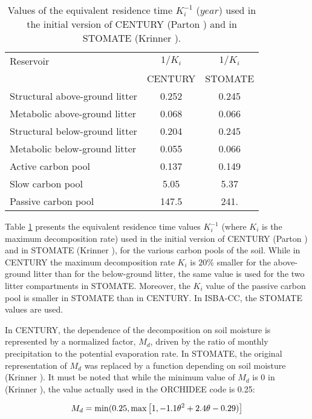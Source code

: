 {\begin{table}[htbp]
\begin{center}
\begin{tabular}{|l|c|c|}
\hline
Reservoir                        & $1/K_i$ & $1/K_i$ \\
                                 & CENTURY & STOMATE \\
\hline
Structural above-ground litter   & 0.252 & 0.245 \\
Metabolic above-ground litter    & 0.068 & 0.066 \\
Structural below-ground litter   & 0.204 & 0.245 \\
Metabolic below-ground litter    & 0.055 & 0.066 \\
Active carbon pool		   & 0.137 & 0.149 \\
Slow carbon pool                 & 5.05  & 5.37  \\
Passive carbon pool		   & 147.5 & 241.  \\
\hline
\end{tabular}
\end{center}
\caption{\label{tabki}
         Values of the equivalent residence time $K_i^{-1}$ ($year$) 
	 used in the initial version of CENTURY (Parton ) and in 
         STOMATE (Krinner ).}
\end{table}


Table \ref{tabki} presents the equivalent residence time values $K_i^{-1}$ (where $K_i$ 
is the maximum decomposition rate) 
used in the initial version of CENTURY (Parton ) and in STOMATE 
(Krinner ), for the various carbon pools of the soil.
While in CENTURY the maximum decomposition rate $K_i$ is $20 \%$ smaller for the above-ground litter 
than for the below-ground litter, the same value is used for the two litter compartments 
in STOMATE.
Moreover, the $K_i$ value of the passive carbon pool is smaller in
STOMATE than in CENTURY.
In ISBA-CC, the STOMATE values are used.

In CENTURY, the dependence of the decomposition on soil moisture is represented by a normalized factor, $M_d$,
driven by the ratio of monthly precipitation to the potential evaporation rate.
In STOMATE, the original representation of $M_d$ was replaced by a function depending on soil moisture 
(Krinner ). It must be noted that while the minimum value of $M_d$ is 0 in 
(Krinner ), the value actually used in the ORCHIDEE code is 0.25:

\begin{equation}
M_d = {\rm min}(0.25, {\rm max}\left[ 1, -1.1 \theta^2 + 2.4 \theta - 0.29)\right]
\end{equation}

}
